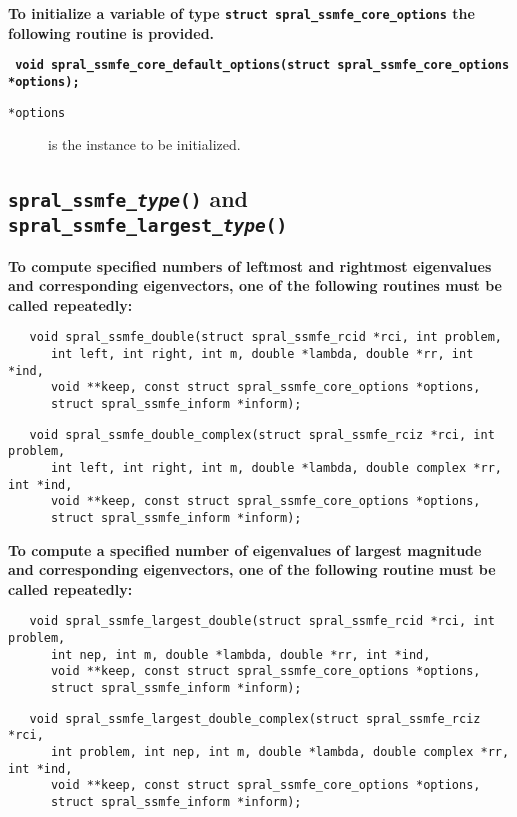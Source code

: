 \textbf{To initialize a variable of type \texttt{struct spral\_ssmfe\_core\_options}
the following routine is provided.}

\medskip
\noindent
\textbf{\texttt{
      \hspace*{0.3cm} void spral\_ssmfe\_core\_default\_options(struct spral\_ssmfe\_core\_options *options);
}}

\noindent
\begin{description}
   \item[\texttt{*options}] is the instance to be initialized.
\end{description}

\subsection{\texttt{spral\_ssmfe\_\textit{type}()} and \texttt{spral\_ssmfe\_largest\_\textit{type}()}} \label{ssmfe:routine:ssmfe}

{\bf
To compute specified numbers
of leftmost and rightmost eigenvalues 
and corresponding eigenvectors,
one of the following routines must be called repeatedly:
}

\begin{verbatim}
   void spral_ssmfe_double(struct spral_ssmfe_rcid *rci, int problem,
      int left, int right, int m, double *lambda, double *rr, int *ind,
      void **keep, const struct spral_ssmfe_core_options *options,
      struct spral_ssmfe_inform *inform);
\end{verbatim}
\begin{verbatim}
   void spral_ssmfe_double_complex(struct spral_ssmfe_rciz *rci, int problem,
      int left, int right, int m, double *lambda, double complex *rr, int *ind,
      void **keep, const struct spral_ssmfe_core_options *options,
      struct spral_ssmfe_inform *inform);
\end{verbatim}


\medskip
\noindent
{\bf
To compute a specified number
of eigenvalues of largest magnitude 
and corresponding eigenvectors,
one of the following routine must be called repeatedly:
}

\begin{verbatim}
   void spral_ssmfe_largest_double(struct spral_ssmfe_rcid *rci, int problem,
      int nep, int m, double *lambda, double *rr, int *ind,
      void **keep, const struct spral_ssmfe_core_options *options,
      struct spral_ssmfe_inform *inform);
\end{verbatim}
\begin{verbatim}
   void spral_ssmfe_largest_double_complex(struct spral_ssmfe_rciz *rci,
      int problem, int nep, int m, double *lambda, double complex *rr, int *ind,
      void **keep, const struct spral_ssmfe_core_options *options,
      struct spral_ssmfe_inform *inform);
\end{verbatim}

